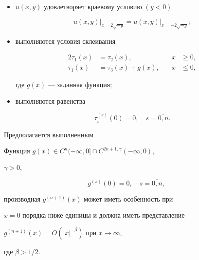 {\begin{itemize}
\begin{gather}
{(-n+1/2)_ss!}y^s,\notag


\end{gather}


$(\alpha )_0=1$,


$(\alpha )_s=\alpha (\alpha +1)(\alpha +2)\dotsb (\alpha +s-1);$


\item[5)] $u(x,y) $ удовлетворяет краевому условию $(y<0)$


\begin{equation}


u(x,y)\vert_{x=2\sqrt{-y}}=u(x,y)\vert_{x=-2\sqrt{-y}};


\end{equation}


\item[6)] выполняются условия склеивания


\begin{alignat}{2}


\tau_1(x)&=\tau_2(x), &\quad x &\ge 0,\\


\tau_1(x)&=\tau_3(x)+g(x), &\quad x &\le 0,


\end{alignat}


где $g(x)$ --- заданная функция$;$


\item[7)] выполняются равенства


\begin{equation}


\tau_i^{(s)}(0) = 0, \quad s= \overline{0,n}.


\end{equation}


\end{itemize}


}





Предполагается выполненным





\begin{cond}


Функция $ g(x) \in 


C^n( -\infty , 0] \cap C^{2n+1,\gamma}(-\infty,0)$,


$\gamma >0$,


$$


g^{(s)}(0)=0, \quad s=\overline{0,n},


$$


производная $g^{(n+1)}(x)$ может иметь особенность при


$x=0$ порядка ниже единицы и должна иметь представление


$g^{(n+1)}(x)=O(|x|^{-\beta})$ при $x\rightarrow \infty$,


где $\beta > 1/2$.


\end{cond}





